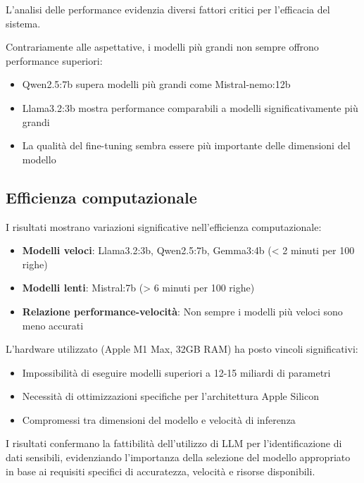 \documentclass[12pt]{report}
\begin{document}
L'analisi delle performance evidenzia diversi fattori critici per l'efficacia del sistema.

Contrariamente alle aspettative, i modelli più grandi non sempre offrono performance superiori:
\begin{itemize}
    \item Qwen2.5:7b supera modelli più grandi come Mistral-nemo:12b
    \item Llama3.2:3b mostra performance comparabili a modelli significativamente più grandi
    \item La qualità del fine-tuning sembra essere più importante delle dimensioni del modello
\end{itemize}

\subsection{Efficienza computazionale}
\label{subsec:efficienza_computazionale}

I risultati mostrano variazioni significative nell'efficienza computazionale:
\begin{itemize}
    \item \textbf{Modelli veloci}: Llama3.2:3b, Qwen2.5:7b, Gemma3:4b (< 2 minuti per 100 righe)
    \item \textbf{Modelli lenti}: Mistral:7b (> 6 minuti per 100 righe)
    \item \textbf{Relazione performance-velocità}: Non sempre i modelli più veloci sono meno accurati
\end{itemize}


L'hardware utilizzato (Apple M1 Max, 32GB RAM) ha posto vincoli significativi:
\begin{itemize}
    \item Impossibilità di eseguire modelli superiori a 12-15 miliardi di parametri
    \item Necessità di ottimizzazioni specifiche per l'architettura Apple Silicon
    \item Compromessi tra dimensioni del modello e velocità di inferenza
\end{itemize}

I risultati confermano la fattibilità dell'utilizzo di LLM per l'identificazione di dati sensibili, evidenziando l'importanza della selezione del modello appropriato in base ai requisiti specifici di accuratezza, velocità e risorse disponibili.
\end{document}
